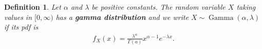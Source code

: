 \documentclass{article}
\theoremstyle{sltheorem}
\newtheorem{definition}{Definition}[section]
\DeclareMathOperator{\GD}{Gamma}
\newcommand*\B[1]{\textbf{#1}}
\begin{document}
\begin{definition}
    Let $\alpha$ and $\lambda$ be positive constants. The random variable
    $X$ taking values in $[0,\infty)$ has a \B{gamma distribution} and we 
    write $X\sim\GD(\alpha, \lambda)$ if its pdf is
    \begin{align*}
        f_X(x) = \frac{\lambda^\alpha}{\Gamma(a)}x^{\alpha-1}e^{-\lambda x}.
    \end{align*}
\end{definition}
\end{document}
